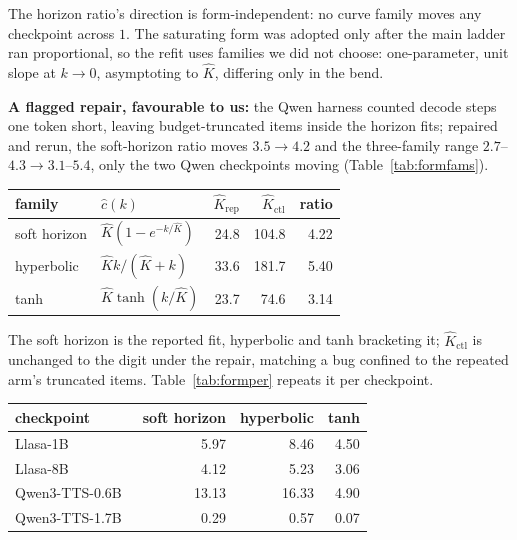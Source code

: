 The horizon ratio's direction is form-independent: no curve family moves any checkpoint across
$1$. The saturating form was adopted only after the main ladder ran proportional, so the refit
uses families we did not choose: one-parameter, unit slope at $k\to0$, asymptoting to $\hat K$,
differing only in the bend.

\noindent\textbf{A flagged repair, favourable to us:} the Qwen harness counted decode steps one
token short, leaving budget-truncated items inside the horizon fits; repaired and rerun, the
soft-horizon ratio moves $3.5\to4.2$ and the three-family range $2.7$--$4.3\to3.1$--$5.4$, only
the two Qwen checkpoints moving (Table~\ref{tab:formfams}).

\par\medskip\noindent\begin{minipage}{\columnwidth}
\label{tab:formfams}
\centering
\begin{tabular}{llrrr}
\toprule
family & $\hat c(k)$ & $\hat K_{\mathrm{rep}}$ & $\hat K_{\mathrm{ctl}}$ & ratio \\
\midrule
soft horizon & $\hat K(1-e^{-k/\hat K})$ & 24.8 & 104.8 & 4.22 \\
hyperbolic   & $\hat K k/(\hat K+k)$     & 33.6 & 181.7 & 5.40 \\
tanh         & $\hat K\tanh(k/\hat K)$   & 23.7 &  74.6 & 3.14 \\
\bottomrule
\end{tabular}
\end{minipage}\par\medskip


\noindent The soft horizon is the reported fit, hyperbolic and tanh bracketing it;
$\hat K_{\mathrm{ctl}}$ is unchanged to the digit under the repair, matching a bug confined to
the repeated arm's truncated items. Table~\ref{tab:formper} repeats it per
checkpoint.

\par\medskip\noindent\begin{minipage}{\columnwidth}
\label{tab:formper}
\centering
\begin{tabular}{lrrr}
\toprule
checkpoint & soft horizon & hyperbolic & tanh \\
\midrule
Llasa-1B~\cite{ye2025llasa} &  5.97 &  8.46 & 4.50 \\
Llasa-8B &  4.12 &  5.23 & 3.06 \\
Qwen3-TTS-0.6B~\cite{hu2026qwen3tts} & 13.13 & 16.33 & 4.90 \\
Qwen3-TTS-1.7B &  0.29 &  0.57 & 0.07 \\
\bottomrule
\end{tabular}
\end{minipage}\par\medskip


